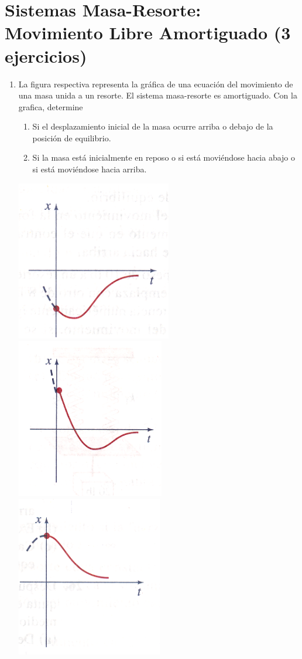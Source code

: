 \documentclass[letterpaper,10pt]{memoir}
\begin{document}
\section*{Sistemas Masa-Resorte: Movimiento Libre Amortiguado (3 ejercicios)} %
\begin{enumerate}
	\item La figura respectiva representa la gráfica de una ecuación del movimiento de una masa unida a un resorte. El sistema masa-resorte es amortiguado. Con la grafica, determine
		\begin{enumerate}
			\item Si el desplazamiento inicial de la masa ocurre arriba o debajo de la posición de equilibrio.
			\item Si la masa está inicialmente en reposo o si está moviéndose hacia abajo o si está moviéndose hacia arriba.
		\end{enumerate}
		\begin{center}
			\includegraphics[height=7cm]{IMAGENES/images/image4.png}
			\includegraphics[height=7cm]{IMAGENES/images/image1.png}
			\includegraphics[height=7cm]{IMAGENES/images/image2.png}

\end{center}
\end{enumerate}
\end{document}
